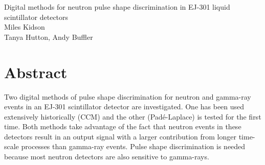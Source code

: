 \documentclass[11pt]{article}
\numberwithin{equation}{section}
\numberwithin{figure}{section}
\numberwithin{table}{section}
\begin{document}
\begin{center}
    {\huge Digital methods for neutron pulse shape discrimination in EJ-301 liquid scintillator detectors}\\
    \vspace{0.2in}
    {\Large Miles Kidson}\\
    \vspace{0.1in}
    {\large Tanya Hutton, Andy Buffler}\\

    \section*{Abstract}\label{sec:Abstract} %
    Two digital methods of pulse shape discrimination for neutron and gamma-ray events in an EJ-301 scintillator detector are investigated. One has been used extensively historically (CCM) and the other (Pad\'e-Laplace) is tested for the first time. Both methods take advantage of the fact that neutron events in these detectors result in an output signal with a larger contribution from longer time-scale processes than gamma-ray events. Pulse shape discrimination is needed because most neutron detectors are also sensitive to gamma-rays.
    
\end{center}
\end{document}

